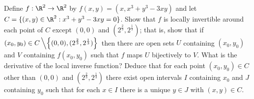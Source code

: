 \begin{problem}Define $f : \R^2 \to \R^2$ by $f(x, y) = (x, x^3+y^3-3xy)$ and let $C = \{(x, y) \in \R^2 : x^3+y^3-3xy = 0\}$. Show that $f$ is locally invertible around each point of $C$ except $(0, 0)$ and $(2^{\frac 23}, 2^{\frac 13})$; that is, show that if $(x_0,y_0) \in C \left\backslash \left\{(0, 0), (2^{\frac 23}, 2^{\frac 13})\right\}\right.$ then there are open sets $U$ containing $(x_0, y_0)$ and $V$ containing $f(x_0, y_0)$ such that $f$ maps $U$ bijectively to $V$. What is the derivative of the local inverse function? Deduce that for each point $(x_0,y_0) \in C$ other than $(0, 0)$ and $(2^{\frac 23}, 2^{\frac 13})$ there exist open intervals $I$ containing $x_0$ and $J$ containing $y_0$ such that for each $x \in I$ there is a unique $y \in J$ with $(x, y) \in C$.



\end{problem}


